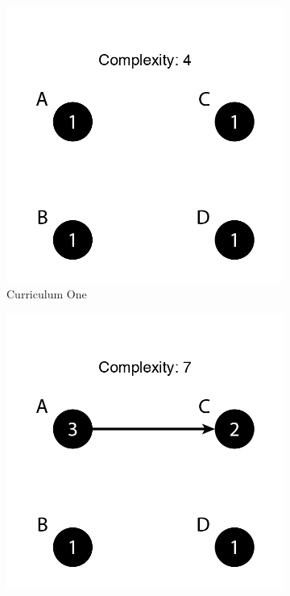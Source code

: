\documentclass[botnum, fleqn]{unmeethesis}
\begin{document}
    \begin{figure}
      \centering
      \begin{subfigure}[h!]{.3\linewidth}
        \includegraphics[width=\linewidth]{./figures/Simple4.png}
        \caption{Curriculum One}\label{fig:simple4}
      \end{subfigure}
      \begin{subfigure}[h!]{.3\linewidth}
        \includegraphics[width=\linewidth]{./figures/Simple7.png}

\end{subfigure}
\end{figure}
\end{document}
